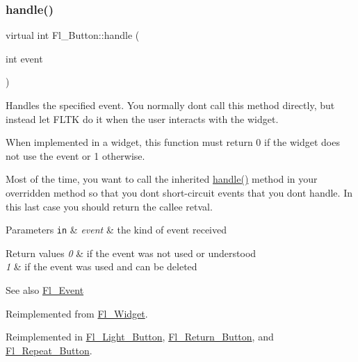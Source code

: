 \subsubsection{\texorpdfstring{handle()}{handle()}}
{\footnotesize\ttfamily virtual int Fl\+\_\+\+Button\+::handle (\begin{DoxyParamCaption}\item[{int}]{event }\end{DoxyParamCaption})\hspace{0.3cm}{\ttfamily [virtual]}}

Handles the specified event. You normally don\textquotesingle{}t call this method directly, but instead let F\+L\+TK do it when the user interacts with the widget.

When implemented in a widget, this function must return 0 if the widget does not use the event or 1 otherwise.

Most of the time, you want to call the inherited \hyperlink{class_fl___button_a85a9bcd4943f577e6eb68f054ae3c80c}{handle()} method in your overridden method so that you don\textquotesingle{}t short-\/circuit events that you don\textquotesingle{}t handle. In this last case you should return the callee retval.


\begin{DoxyParams}[1]{Parameters}
\mbox{\tt in}  & {\em event} & the kind of event received \\
\hline
\end{DoxyParams}

\begin{DoxyRetVals}{Return values}
{\em 0} & if the event was not used or understood \\
\hline
{\em 1} & if the event was used and can be deleted \\
\hline
\end{DoxyRetVals}
\begin{DoxySeeAlso}{See also}
\hyperlink{_enumerations_8_h_ad16daf120d9a0501cccaee563af0b9a3}{Fl\+\_\+\+Event} 
\end{DoxySeeAlso}


Reimplemented from \hyperlink{class_fl___widget_a3521aba25eda761620953dd49d335ea7}{Fl\+\_\+\+Widget}.



Reimplemented in \hyperlink{class_fl___light___button_a931c5d5d8cb764350c8fe8d78af6231d}{Fl\+\_\+\+Light\+\_\+\+Button}, \hyperlink{class_fl___return___button_a92e2270728a58b60099ddfb322018996}{Fl\+\_\+\+Return\+\_\+\+Button}, and \hyperlink{class_fl___repeat___button_a2033de45cb1eb13e1cdc4910609febdf}{Fl\+\_\+\+Repeat\+\_\+\+Button}.

